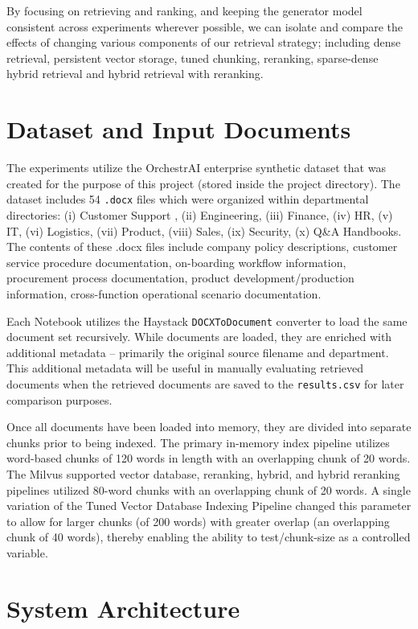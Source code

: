 By focusing on retrieving and ranking, and keeping the generator model consistent across experiments wherever possible, we can isolate and compare the effects of changing various components of our retrieval strategy; including dense retrieval, persistent vector storage, tuned chunking, reranking, sparse-dense hybrid retrieval and hybrid retrieval with reranking.

\section{Dataset and Input Documents}

The experiments utilize the OrchestrAI enterprise synthetic dataset that was created for the purpose of this project (stored inside the project directory). The dataset includes 54 \texttt{.docx} files which were organized within departmental directories: (i) Customer Support , (ii) Engineering, (iii) Finance, (iv) HR, (v) IT, (vi) Logistics, (vii) Product, (viii) Sales, (ix) Security, (x) {Q\&A} Handbooks. The contents of these .docx files include company policy descriptions, customer service procedure documentation, on-boarding workflow information, procurement process documentation, product development/production information, cross-function operational scenario documentation. 

Each Notebook utilizes the Haystack \texttt{DOCXTo\allowbreak Document} converter to load the same document set recursively. While documents are loaded, they are enriched with additional metadata – primarily the original source filename and department. This additional metadata will be useful in manually evaluating retrieved documents when the retrieved documents are saved to the \texttt{results.csv} for later comparison purposes. 

Once all documents have been loaded into memory, they are divided into separate chunks prior to being indexed. The primary in-memory index pipeline utilizes word-based chunks of 120 words in length with an overlapping chunk of 20 words. The Milvus supported vector database, reranking, hybrid, and hybrid reranking pipelines utilized 80-word chunks with an overlapping chunk of 20 words. A single variation of the Tuned Vector Database Indexing Pipeline changed this parameter to allow for larger chunks (of 200 words) with greater overlap (an overlapping chunk of 40 words), thereby enabling the ability to test/chunk-size as a controlled variable.

\section{System Architecture}

